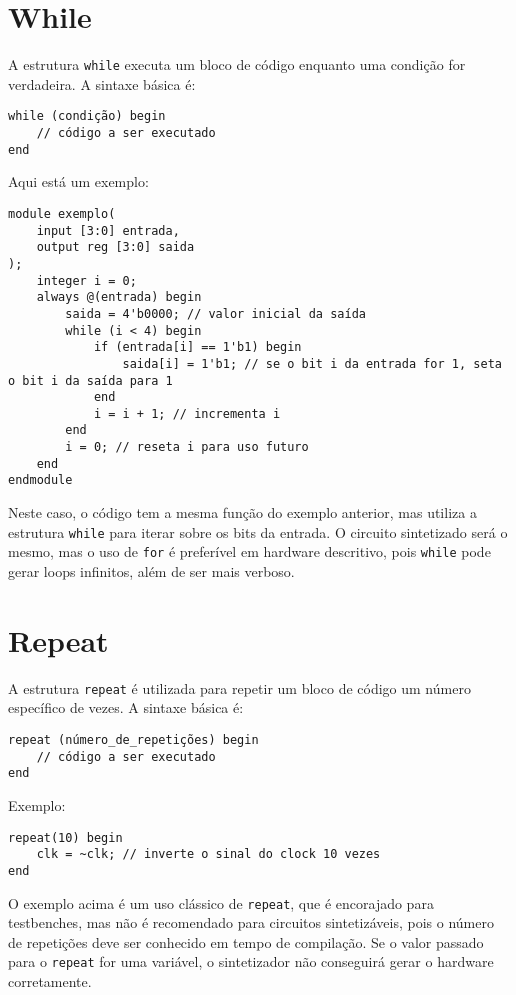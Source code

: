 \documentclass{article}
\begin{document}
\section*{While}

A estrutura \texttt{while} executa um bloco de código enquanto uma condição for verdadeira. A sintaxe básica é:

\begin{lstlisting}
while (condição) begin
    // código a ser executado
end
\end{lstlisting}

Aqui está um exemplo:

\begin{lstlisting}
module exemplo(
    input [3:0] entrada,
    output reg [3:0] saida
);
    integer i = 0;
    always @(entrada) begin
        saida = 4'b0000; // valor inicial da saída
        while (i < 4) begin
            if (entrada[i] == 1'b1) begin
                saida[i] = 1'b1; // se o bit i da entrada for 1, seta o bit i da saída para 1
            end
            i = i + 1; // incrementa i
        end
        i = 0; // reseta i para uso futuro
    end
endmodule
\end{lstlisting}

Neste caso, o código tem a mesma função do exemplo anterior, mas utiliza a estrutura \texttt{while} para iterar sobre os bits da entrada. O circuito sintetizado será o mesmo, mas o uso de \texttt{for} é preferível em hardware descritivo, pois \texttt{while} pode gerar loops infinitos, além de ser mais verboso.

\section*{Repeat}

A estrutura \texttt{repeat} é utilizada para repetir um bloco de código um número específico de vezes. A sintaxe básica é:

\begin{lstlisting}
repeat (número_de_repetições) begin
    // código a ser executado
end
\end{lstlisting}

Exemplo:

\begin{lstlisting}
repeat(10) begin
    clk = ~clk; // inverte o sinal do clock 10 vezes
end
\end{lstlisting}

O exemplo acima é um uso clássico de \texttt{repeat}, que é encorajado para testbenches, mas não é recomendado para circuitos sintetizáveis, pois o número de repetições deve ser conhecido em tempo de compilação. Se o valor passado para o \texttt{repeat} for uma variável, o sintetizador não conseguirá gerar o hardware corretamente.
\end{document}
